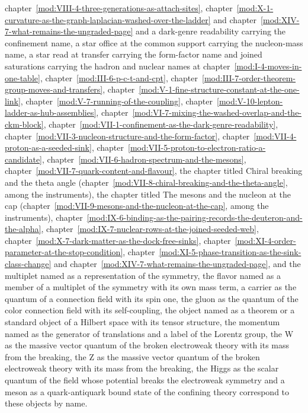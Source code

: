 \begin{chbridge}
chapter~\ref{mod:VIII-4-three-generations-as-attach-sites}, chapter~\ref{mod:X-1-curvature-as-the-graph-laplacian-washed-over-the-ladder} and chapter~\ref{mod:XIV-7-what-remains-the-ungraded-page} and a dark-genre readability carrying the confinement name, a star office at the common support carrying the nucleon-mass name, a star read at transfer carrying the form-factor name and joined saturations carrying the hadron and nuclear names at chapter~\ref{mod:I-4-moves-in-one-table}, chapter~\ref{mod:III-6-p-c-t-and-cpt}, chapter~\ref{mod:III-7-order-theorem-group-moves-and-transfers}, chapter~\ref{mod:V-1-fine-structure-constant-at-the-one-link}, chapter~\ref{mod:V-7-running-of-the-coupling}, chapter~\ref{mod:V-10-lepton-ladder-as-hub-assemblies}, chapter~\ref{mod:VI-7-mixing-the-washed-overlap-and-the-ckm-block}, chapter~\ref{mod:VII-1-confinement-as-the-dark-genre-readability}, chapter~\ref{mod:VII-3-nucleon-structure-and-the-form-factor}, chapter~\ref{mod:VII-4-proton-as-a-seeded-sink}, chapter~\ref{mod:VII-5-proton-to-electron-ratio-a-candidate}, chapter~\ref{mod:VII-6-hadron-spectrum-and-the-mesons}, chapter~\ref{mod:VII-7-quark-content-and-flavour}, the chapter titled Chiral breaking and the theta angle (chapter~\ref{mod:VII-8-chiral-breaking-and-the-theta-angle}, among the instruments), the chapter titled The mesons and the nucleon at the cap (chapter~\ref{mod:VII-9-mesons-and-the-nucleon-at-the-cap}, among the instruments), chapter~\ref{mod:IX-6-binding-as-the-pairing-records-the-deuteron-and-the-alpha}, chapter~\ref{mod:IX-7-nuclear-rows-at-the-joined-seeded-web}, chapter~\ref{mod:X-7-dark-matter-as-the-dock-free-sinks}, chapter~\ref{mod:XI-4-order-parameter-at-the-stop-condition}, chapter~\ref{mod:XI-5-phase-transition-as-the-sink-class-change} and chapter~\ref{mod:XIV-7-what-remains-the-ungraded-page}, and the multiplet named as a representation of the symmetry, the flavor named as a member of a multiplet of the symmetry with its own mass term, a carrier as the quantum of a connection field with its spin one, the gluon as the quantum of the color connection field with its self-coupling, the object named as a theorem or a standard object of a Hilbert space with its tensor structure, the momentum named as the generator of translations and a label of the Lorentz group, the W as the massive vector quantum of the broken electroweak theory with its mass from the breaking, the Z as the massive vector quantum of the broken electroweak theory with its mass from the breaking, the Higgs as the scalar quantum of the field whose potential breaks the electroweak symmetry and a meson as a quark-antiquark bound state of the confining theory correspond to these objects by name.
\end{chbridge}
